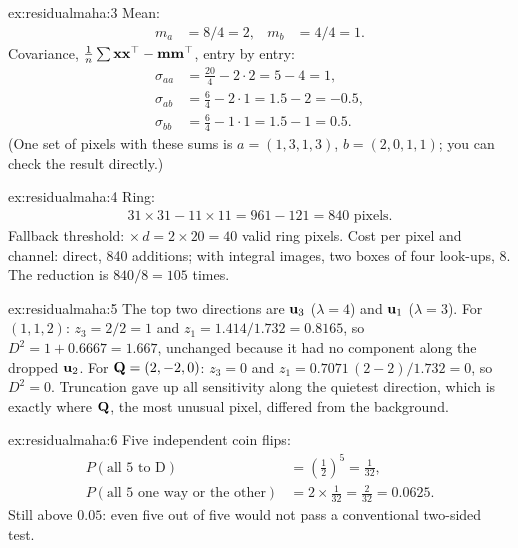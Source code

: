 \begin{solution}{ex:residualmaha:3}
Mean:
\begin{align*}
m_a &= 8/4 = 2, & m_b &= 4/4 = 1.
\end{align*}
Covariance, $\frac1n\sum\mathbf{x}\mathbf{x}^{\top}-\mathbf{m}\mathbf{m}^{\top}$, entry by entry:
\begin{align*}
\sigma_{aa} &= \frac{20}{4}-2\cdot2 = 5-4 = 1,\\
\sigma_{ab} &= \frac{6}{4}-2\cdot1 = 1.5-2 = -0.5,\\
\sigma_{bb} &= \frac{6}{4}-1\cdot1 = 1.5-1 = 0.5.
\end{align*}
(One set of pixels with these sums is $a=(1,3,1,3)$, $b=(2,0,1,1)$; you can check the result directly.)
\end{solution}

\begin{solution}{ex:residualmaha:4}
Ring:
\begin{align*}
31\times31-11\times11 = 961-121 = 840 \text{ pixels}.
\end{align*}
Fallback threshold:  $\times\, d=2\times20=40$ valid ring pixels. Cost per pixel and
channel: direct, 840 additions; with integral images, two boxes of four look-ups, 8. The reduction is
$840/8=105$ times.
\end{solution}

\begin{solution}{ex:residualmaha:5}
The top two directions are $\mathbf{u}_3$ ($\lambda=4$) and $\mathbf{u}_1$ ($\lambda=3$). For $(1,1,2)$:
$z_3=2/2=1$ and $z_1=1.414/1.732=0.8165$, so $D^2=1+0.6667=1.667$, unchanged because it had no component
along the dropped $\mathbf{u}_2$. For $\mathbf{Q}=(2,-2,0)$: $z_3=0$ and $z_1=0.7071\,(2-2)/1.732=0$, so $D^2=0$.
Truncation gave up all sensitivity along the quietest direction, which is exactly where $\mathbf{Q}$, the most
unusual pixel, differed from the background.
\end{solution}

\begin{solution}{ex:residualmaha:6}
Five independent coin flips:
\begin{align*}
P(\text{all 5 to D}) &= \left(\tfrac12\right)^5 = \tfrac{1}{32},\\
P(\text{all 5 one way or the other}) &= 2\times\tfrac{1}{32} = \tfrac{2}{32} = 0.0625.
\end{align*}
Still above $0.05$: even five out of five would not pass a conventional two-sided test.
\end{solution}
